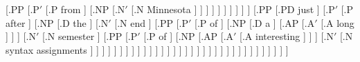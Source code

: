\documentclass{article}
\begin{document}
\begin{landscape}
{                                                          [.PP [.P$'$ [.{P\degree} from ]
                                                                        [.NP [.N$'$ [.{N\degree\textsubscript{\rbrack}} Minnesota ] ] ] ] ] ] ] ] ] ]
                            [.PP [.PD just ]
                                 [.P$'$ [.{P\degree} after ]
                                        [.NP [.D the ] [.N$'$   [.{N\degree\textsubscript{\rbrack}} end ]
                                                                [.PP [.P$'$ [.{P\degree} of ]
                                                                            [.NP [.D a ]
                                                                                [.AP [.A$'$ [.{A\degree} long ] ] ]
                                                                                [.N$'$ [.{N\degree\textsubscript{\rbrack}} semester ]
                                                                                        [.PP [.P$'$ [.{P\degree} of ]
                                                                                                    [.NP [.AP [.A$'$ [.{A\degree} interesting ] ] ]
                                                                                                         [.N$'$ [.{N\degree\textsubscript{\rbrack}} {syntax assignments} ] ] ] ] ] ] ] ] ] ] ] ] ] ] ] ] ] ] ] ] ] ] ] ] ] ] ] ] ] ] ] ] ] ]
}

\resizebox{\linewidth}{!}{%

}
\end{landscape}
\end{document}
